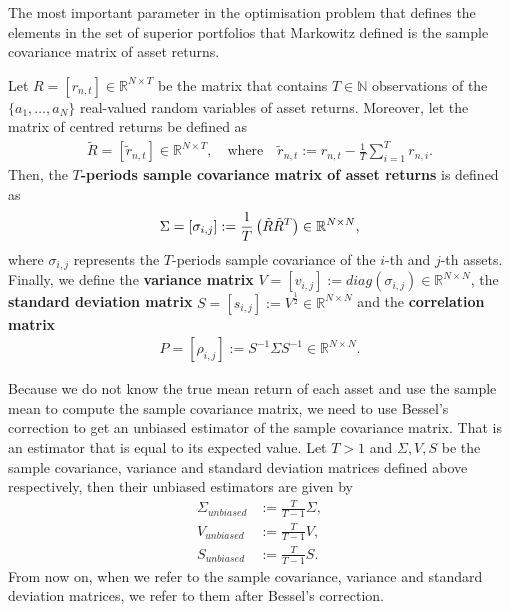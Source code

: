     The most important parameter in the optimisation problem that defines the elements in the set of superior portfolios that Markowitz defined is the sample covariance matrix of asset returns.
    
    \begin{definition}\label{definition:CovarianceMatrix}
       Let $R = [r_{n,t}] \in \mathbb{R}^{N \times T}$ be the matrix that contains $T \in \mathbb{N}$ observations of the $\{ a_1, \dots, a_N \}$ real-valued random variables of asset returns. Moreover, let the matrix of centred returns be defined as
       \begin{align*}
           \tilde{R} = [\tilde{r}_{n,t}] \in \mathbb{R}^{N \times T}, \quad \text{where} \quad \tilde{r}_{n,t} := r_{n,t} - \frac{1}{T} \sum_{i=1}^T r_{n,i}.
       \end{align*}
       Then, the \textbf{$T$-periods sample covariance matrix of asset returns} is defined as
       \begin{align*}
           \Sigma = [\sigma_{i,j}] := \frac{1}{T} \left( \Tilde{R} \Tilde{R}^T \right) \in \mathbb{R}^{N \times N},
       \end{align*}
       where $\sigma_{i,j}$ represents the $T$-periods sample covariance of the $i$-th and $j$-th assets. Finally, we define the \textbf{variance matrix} $V = [v_{i,j}] := diag(\sigma_{i,j}) \in \mathbb{R}^{N \times N}$, the \textbf{standard deviation matrix} $S = [s_{i,j}] := V^{\frac{1}{2}} \in \mathbb{R}^{N \times N}$ and the \textbf{correlation matrix}
       \begin{align*}
           P = [\rho_{i,j}] := S^{-1} \Sigma S^{-1} \in \mathbb{R}^{N \times N}.
       \end{align*}
    \end{definition}
    
    \begin{remark}\label{remark:UnbiasedSampleCovarianceMatrix}
        Because we do not know the true mean return of each asset and use the sample mean to compute the sample covariance matrix, we need to use Bessel's correction to get an unbiased estimator of the sample covariance matrix. That is an estimator that is equal to its expected value. Let $T > 1$ and $\Sigma, V, S$ be the sample covariance, variance and standard deviation matrices defined above respectively, then their unbiased estimators are given by
        \begin{align*}
            \Sigma_{unbiased} &:= \frac{T}{T-1} \Sigma, \\
            V_{unbiased} &:= \frac{T}{T-1} V, \\
            S_{unbiased} &:= \frac{T}{T-1} S.
        \end{align*}
        From now on, when we refer to the sample covariance, variance and standard deviation matrices, we refer to them after Bessel's correction.
    \end{remark}
    
